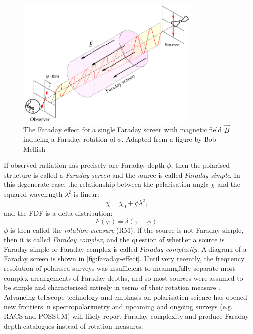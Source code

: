 \documentclass[11pt, a4paper]{book}
\newcommand{\defn}[1]{\emph{#1}}
\begin{document}
        \begin{figure}
            \centering
            \includegraphics[width=0.8\textwidth]{images/Faraday-effect.eps}
            \caption[A Faraday screen.]{\label{fig:faraday-effect} The Faraday effect for a single Faraday screen with magnetic field $\vec B$ inducing a Faraday rotation of $\phi$. Adapted from a figure by Bob Mellish.}
        \end{figure}

        If observed radiation has precisely one Faraday depth $\phi$, then the polarised structure is called a \defn{Faraday screen} and the source is called \defn{Faraday simple}. In this degenerate case, the relationship between the polarisation angle $\chi$ and the squared wavelength $\lambda^2$ is linear:
        \begin{equation}
            \chi = \chi_0 + \phi \lambda^2,
        \end{equation}
        and the FDF is a delta distribution:
        \begin{equation}
            F(\varphi) = \delta(\varphi - \phi).
        \end{equation}
        $\phi$ is then called the \defn{rotation measure} (RM). If the source is not Faraday simple, then it is called \defn{Faraday complex}, and the question of whether a source is Faraday simple or Faraday complex is called \defn{Faraday complexity}. A diagram of a Faraday screen is shown in \autoref{fig:faraday-effect}. Until very recently, the frequency resolution of polarised surveys was insufficient to meaningfully separate most complex arrangements of Faraday depths, and so most sources were assumed to be simple and characterised entirely in terms of their rotation measure \citep[e.g.][]{taylor_rotation_2009}. Advancing telescope technology and emphasis on polarisation science has opened new frontiers in spectropolarimetry and upcoming and ongoing surveys (e.g. RACS and POSSUM) will likely report Faraday complexity and produce Faraday depth catalogues instead of rotation measures.
\end{document}
